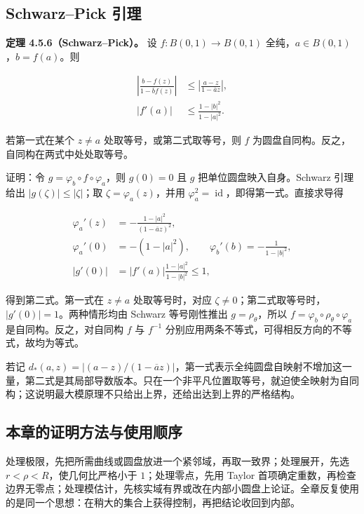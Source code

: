 \documentclass[11pt,a4paper]{article}
\begin{document}
\subsection{Schwarz--Pick 引理}\label{ch04-s5-heading-4}

\textbf{定理 4.5.6（Schwarz--Pick）。} 设 \(f:B(0,1)\to B(0,1)\)
全纯，\(a\in B(0,1)\)，\(b=f(a)\)。则

\[
\begin{aligned}
\left|\frac{b-f(z)}{1-\overline b f(z)}\right|
&\le\left|\frac{a-z}{1-\overline a z}\right|,\\
|f'(a)|&\le\frac{1-|b|^2}{1-|a|^2}.
\end{aligned}
\]

若第一式在某个 \(z\ne a\) 处取等号，或第二式取等号，则 \(f\)
为圆盘自同构。反之，自同构在两式中处处取等号。

证明：令 \(g=\varphi_b\circ f\circ\varphi_a\)，则 \(g(0)=0\) 且 \(g\)
把单位圆盘映入自身。Schwarz 引理给出 \(|g(\zeta)|\le|\zeta|\)；取
\(\zeta=\varphi_a(z)\)，并用
\(\varphi_a^2=\operatorname{id}\)，即得第一式。直接求导得

\[
\begin{aligned}
\varphi_a'(z)&=-\frac{1-|a|^2}{(1-\overline a z)^2},\\
\varphi_a'(0)&=-(1-|a|^2),\qquad
\varphi_b'(b)=-\frac1{1-|b|^2},\\
|g'(0)|&=|f'(a)|\frac{1-|a|^2}{1-|b|^2}\le1,
\end{aligned}
\]

得到第二式。第一式在 \(z\ne a\) 处取等号时，对应
\(\zeta\ne0\)；第二式取等号时，\(|g'(0)|=1\)。两种情形均由 Schwarz
等号刚性推出 \(g=\rho_\theta\)，所以
\(f=\varphi_b\circ\rho_\theta\circ\varphi_a\) 是自同构。反之，对自同构
\(f\) 与 \(f^{-1}\)
分别应用两条不等式，可得相反方向的不等式，故均为等式。

若记
\(d_*(a,z)=|(a-z)/(1-\overline a z)|\)，第一式表示全纯圆盘自映射不增加这一量，第二式是其局部导数版本。只在一个非平凡位置取等号，就迫使全映射为自同构；这说明最大模原理不只给出上界，还给出达到上界的严格结构。

\subsection{本章的证明方法与使用顺序}\label{ch04-s5-heading-5}

处理极限，先把所需曲线或圆盘放进一个紧邻域，再取一致界；处理展开，先选
\(r<\rho<R\)，使几何比严格小于 \(1\)；处理零点，先用 Taylor
首项确定重数，再检查边界无零点；处理模估计，先核实域有界或改在内部小圆盘上论证。全章反复使用的是同一个思想：在稍大的集合上获得控制，再把结论收回到内部。
\end{document}
